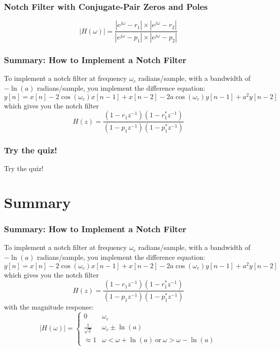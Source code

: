 \documentclass{beamer}
\begin{document}
\begin{frame}
  \frametitle{Notch Filter with Conjugate-Pair Zeros and Poles}
  \begin{displaymath}
    |H(\omega)|=\frac{|e^{j\omega}-r_1|\times|e^{j\omega}-r_2|}{|e^{j\omega}-p_1|\times|e^{j\omega}-p_2|}
  \end{displaymath}
  \centerline{}
\end{frame}

\begin{frame}
  \frametitle{Summary: How to Implement a Notch Filter}

  To implement a notch filter at frequency $\omega_c$ radians/sample,
  with a bandwidth of $-\ln(a)$ radians/sample, you implement the difference equation:
  \begin{displaymath}
    y[n] = x[n]-2\cos(\omega_c)x[n-1]+x[n-2]-2a\cos(\omega_c)y[n-1]+a^2y[n-2]
  \end{displaymath}
  which gives you the notch filter
  \begin{displaymath}
    H(z) = \frac{(1-r_1z^{-1})(1-r_1^*z^{-1})}{(1-p_1z^{-1})(1-p_1^*z^{-1})}
  \end{displaymath}
\end{frame}

\begin{frame}
  \frametitle{Try the quiz!}

  Try the quiz!
\end{frame}

\section[Summary]{Summary}
\setcounter{subsection}{1}
  
\begin{frame}
  \frametitle{Summary: How to Implement a Notch Filter}

  To implement a notch filter at frequency $\omega_c$ radians/sample,
  with a bandwidth of $-\ln(a)$ radians/sample, you implement the difference equation:
  \begin{displaymath}
    y[n] = x[n]-2\cos(\omega_c)x[n-1]+x[n-2]-2a\cos(\omega_c)y[n-1]+a^2y[n-2]
  \end{displaymath}
  which gives you the notch filter
  \begin{displaymath}
    H(z) = \frac{(1-r_1z^{-1})(1-r_1^*z^{-1})}{(1-p_1z^{-1})(1-p_1^*z^{-1})}
  \end{displaymath}
  with the magnitude response:
  \begin{displaymath}
    |H(\omega)| =\begin{cases}
    0 & \omega_c\\
    \frac{1}{\sqrt{2}} & \omega_c \pm \ln(a)\\
    \approx 1 & \omega < \omega+\ln(a)~\mbox{or}~\omega > \omega-\ln(a)
    \end{cases}
  \end{displaymath}
\end{frame}
\end{document}
